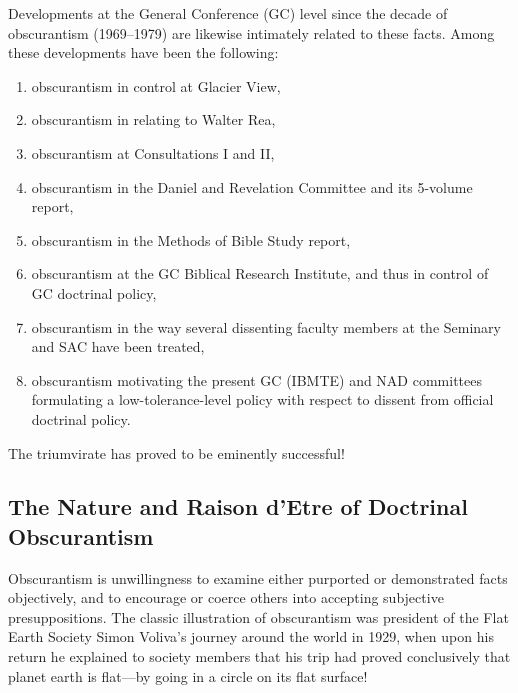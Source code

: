 Developments at the General Conference (GC) level since the decade of
obscurantism (1969--1979) are likewise intimately related to these facts.
Among these developments have been the following:
\begin{enumerate}
	\item obscurantism in control at Glacier View, 
	\item obscurantism in relating to Walter Rea,
	\item obscurantism at Consultations I and II,
	\item obscurantism in the Daniel and Revelation Committee and its 5-volume 
	report, 
	\item obscurantism in the Methods of Bible Study 
	report,
	\item obscurantism at the GC Biblical
	Research Institute, and thus in control of GC doctrinal policy,
	\item obscurantism in the way several dissenting faculty members at the 
	Seminary and SAC have been treated,
	\item obscurantism motivating the present GC
	(IBMTE) and NAD committees formulating a low-tolerance-level policy with
	respect to dissent from official doctrinal policy.
\end{enumerate}
The triumvirate has proved to be eminently successful!

\subsection{The Nature and Raison d'Etre of Doctrinal Obscurantism}

Obscurantism is unwillingness to examine either purported or demonstrated
facts objectively, and to encourage or coerce others into accepting
subjective presuppositions. The classic illustration of obscurantism was
president of the Flat Earth Society Simon Voliva's journey around the world
in 1929, when upon his return he explained to society members that his trip
had proved conclusively that planet earth is flat---by going in a circle on
its flat surface!

